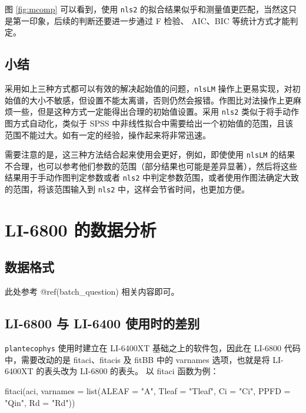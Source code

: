 \documentclass[
]{krantz}
\makeatletter
\newenvironment{Shaded}{\begin{snugshade}}{\end{snugshade}}
\newcommand{\AttributeTok}[1]{\textcolor[rgb]{0.77,0.63,0.00}{#1}}
\newcommand{\FunctionTok}[1]{\textcolor[rgb]{0.00,0.00,0.00}{#1}}
\newcommand{\NormalTok}[1]{#1}
\newcommand{\StringTok}[1]{\textcolor[rgb]{0.31,0.60,0.02}{#1}}
\newenvironment{kframe}{%
\medskip{}
\setlength{\fboxsep}{.8em}
 \def\at@end@of@kframe{}%
 \ifinner\ifhmode%
  \def\at@end@of@kframe{\end{minipage}}%
  \begin{minipage}{\columnwidth}%
 \fi\fi%
 \def\FrameCommand##1{\hskip\@totalleftmargin \hskip-\fboxsep
 \colorbox{shadecolor}{##1}\hskip-\fboxsep
     \hskip-\linewidth \hskip-\@totalleftmargin \hskip\columnwidth}%
 \MakeFramed {\advance\hsize-\width
   \@totalleftmargin\z@ \linewidth\hsize
   \@setminipage}}%
 {\par\unskip\endMakeFramed%
 \at@end@of@kframe}
\renewenvironment{Shaded}{\begin{kframe}}{\end{kframe}}
\makeatother
\begin{document}
图 \ref{fig:mcomp} 可以看到，使用 \texttt{nls2} 的拟合结果似乎和测量值更匹配，当然这只是第一印象，后续的判断还要进一步通过 F 检验、 AIC、BIC 等统计方式才能判定。

\hypertarget{sum_start}{%
\section{小结}\label{sum_start}}

采用如上三种方式都可以有效的解决起始值的问题，\texttt{nlsLM} 操作上更易实现，对初始值的大小不敏感，但设置不能太离谱，否则仍然会报错。作图比对法操作上更麻烦一些，但是这种方式一定能得出合理的初始值设置。采用 \texttt{nls2} 类似于将手动作图方式自动化，类似于 SPSS 中非线性拟合中需要给出一个初始值的范围，且该范围不能过大。如有一定的经验，操作起来将非常迅速。

需要注意的是，这三种方法结合起来使用会更好，例如，即使使用 \texttt{nlsLM} 的结果不合理，也可以参考他们参数的范围（部分结果也可能是差异显著），然后将这些结果用于手动作图判定参数或者 \texttt{nls2} 中判定参数范围，或者使用作图法确定大致的范围，将该范围输入到 \texttt{nls2} 中，这样会节省时间，也更加方便。

\cleardoublepage

\hypertarget{anay_6800}{%
\chapter{LI-6800 的数据分析}\label{anay_6800}}

\hypertarget{data6800}{%
\section{数据格式}\label{data6800}}

此处参考 @ref(batch\_question) 相关内容即可。

\hypertarget{dif}{%
\section{LI-6800 与 LI-6400 使用时的差别}\label{dif}}

\texttt{plantecophys} 使用时建立在 LI-6400XT 基础之上的软件包，因此在 LI-6800 代码中，需要改动的是 fitaci、fitacis 及 fitBB 中的 varnames 选项，也就是将 LI-6400XT 的表头改为 LI-6800 的表头。
以 fitaci 函数为例：

\begin{Shaded}
\begin{Highlighting}[]
 \FunctionTok{fitaci}\NormalTok{(aci, }\AttributeTok{varnames =} 
        \FunctionTok{list}\NormalTok{(}\AttributeTok{ALEAF =} \StringTok{"A"}\NormalTok{, }\AttributeTok{Tleaf =} \StringTok{"Tleaf"}\NormalTok{, }\AttributeTok{Ci =} \StringTok{"Ci"}\NormalTok{, }
          \AttributeTok{PPFD  =} \StringTok{"Qin"}\NormalTok{, }\AttributeTok{Rd =} \StringTok{"Rd"}\NormalTok{))}
\end{Highlighting}
\end{Shaded}
\end{document}
